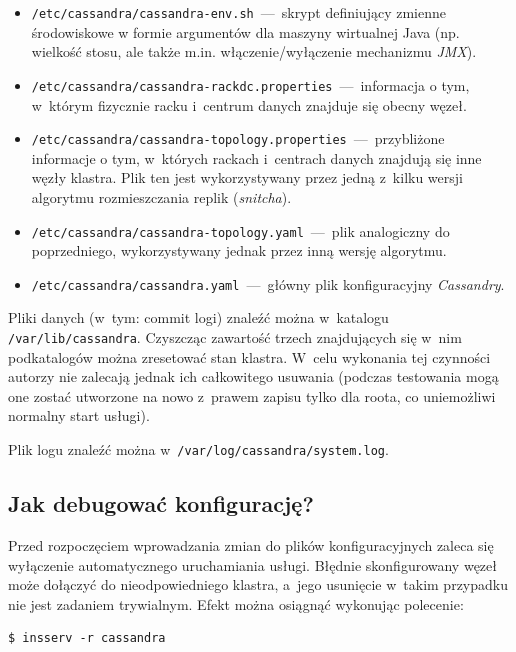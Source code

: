 \documentclass{article} %
\begin{document}
\begin{itemize}
\item \texttt{/etc/cassandra/cassandra-env.sh}~---~skrypt definiujący zmienne środowiskowe w formie argumentów dla maszyny wirtualnej Java (np. wielkość stosu, ale także m.in. włączenie/wyłączenie mechanizmu \emph{JMX}).
\item \texttt{/etc/cassandra/cassandra-rackdc.properties}~---~informacja o tym, w~którym fizycznie racku i~centrum danych znajduje się obecny węzeł.
\item \texttt{/etc/cassandra/cassandra-topology.properties}~---~przybliżone informacje o tym, w~których rackach i~centrach danych znajdują się inne węzły klastra. Plik ten jest wykorzystywany przez jedną z~kilku wersji algorytmu rozmieszczania replik (\emph{snitcha}).
\item \texttt{/etc/cassandra/cassandra-topology.yaml}~---~plik analogiczny do poprzedniego, wykorzystywany jednak przez inną wersję algorytmu.
\item \texttt{/etc/cassandra/cassandra.yaml}~---~główny plik konfiguracyjny \emph{Cassandry}.
\end{itemize}

Pliki danych (w~tym: commit logi) znaleźć można w~katalogu \texttt{/var/lib/cassandra}.
Czyszcząc zawartość trzech znajdujących się w~nim podkatalogów można zresetować stan klastra.
W~celu wykonania tej czynności autorzy nie zalecają jednak ich całkowitego usuwania (podczas testowania mogą one zostać utworzone na nowo z~prawem zapisu tylko dla roota, co uniemożliwi normalny start usługi).

Plik logu znaleźć można w~\texttt{/var/log/cassandra/system.log}.

\subsection{Jak debugować konfigurację?}\label{subsec:config_debug}

Przed rozpoczęciem wprowadzania zmian do plików konfiguracyjnych zaleca się wyłączenie automatycznego uruchamiania usługi.
Błędnie skonfigurowany węzeł może dołączyć do nieodpowiedniego klastra, a~jego usunięcie w~takim przypadku nie jest zadaniem trywialnym.
Efekt można osiągnąć wykonując polecenie:

\begin{lstlisting}[style=bash, caption={wyłączenie uruchamiania \emph{Cassandry} na jej domyślnych runlevelach}]
$ insserv -r cassandra
\end{lstlisting}
\end{document}
